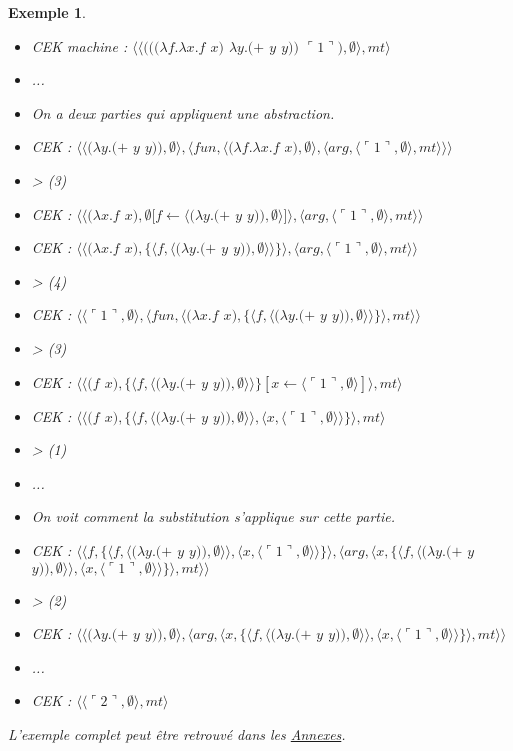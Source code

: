 \documentclass[10pt,a4paper]{report}
\newtheorem{ex}{Exemple}
\begin{document}
\begin{ex}
		\begin{itemize}
			\item[] CEK machine : $\langle\langle(((\lambda f.\lambda x.f$ $x)$ $\lambda y.(+$ $y$ $y))$ $\ulcorner 1\urcorner),\emptyset\rangle,mt\rangle$
			\item[] ...
			\item[] On a deux parties qui appliquent une abstraction.
			\item[] CEK : $\langle\langle(\lambda y.(+$ $y$ $y)),\emptyset\rangle,\langle fun,\langle(\lambda f.\lambda x.f$ $x),\emptyset\rangle,\langle arg,\langle\ulcorner 1\urcorner,\emptyset\rangle,mt\rangle\rangle\rangle$
			\item[] > (3) 
			\item[] CEK : $\langle\langle(\lambda x.f$ $x),\emptyset[f \leftarrow \langle(\lambda y.(+$ $y$ $y)),\emptyset\rangle]\rangle,\langle arg,\langle\ulcorner 1\urcorner,\emptyset\rangle,mt\rangle\rangle$
			\item[] CEK : $\langle\langle(\lambda x.f$ $x),\{\langle f,\langle(\lambda y.(+$ $y$ $y)),\emptyset\rangle\rangle\}\rangle,\langle arg,\langle\ulcorner 1\urcorner,\emptyset\rangle,mt\rangle\rangle$
			\item[] > (4) 
			\item[] CEK : $\langle\langle\ulcorner 1\urcorner,\emptyset\rangle,\langle fun,\langle(\lambda x.f$ $x),\{\langle f,\langle(\lambda y.(+$ $y$ $y)),\emptyset\rangle\rangle\}\rangle,mt\rangle\rangle$
			\item[] > (3) 
			\item[] CEK : $\langle\langle(f$ $x),\{\langle f,\langle(\lambda y.(+$ $y$ $y)),\emptyset\rangle\rangle\}[x \leftarrow \langle\ulcorner 1\urcorner,\emptyset\rangle]\rangle,mt\rangle$
			\item[] CEK : $\langle\langle(f$ $x),\{\langle f,\langle(\lambda y.(+$ $y$ $y)),\emptyset\rangle\rangle,\langle x,\langle\ulcorner 1\urcorner,\emptyset\rangle\rangle\}\rangle,mt\rangle$
			\item[] > (1)
			\item[] ...
			\item[] On voit comment la substitution s'applique sur cette partie.
			\item[] CEK : $\langle\langle f,\{\langle f,\langle(\lambda y.(+$ $y$ $y)),\emptyset\rangle\rangle,\langle x,\langle\ulcorner 1\urcorner,\emptyset\rangle\rangle\}\rangle,\langle arg,\langle x,\{\langle f,\langle(\lambda y.(+$ $y$ $y)),\emptyset\rangle\rangle,\langle x,\langle\ulcorner 1\urcorner,\emptyset\rangle\rangle\}\rangle,mt\rangle\rangle$
			\item[] > (2) 
			\item[] CEK : $\langle\langle(\lambda y.(+$ $y$ $y)),\emptyset\rangle,\langle arg,\langle x,\{\langle f,\langle(\lambda y.(+$ $y$ $y)),\emptyset\rangle\rangle,\langle x,\langle\ulcorner 1\urcorner,\emptyset\rangle\rangle\}\rangle,mt\rangle\rangle$
			\item[] ...
			\item[] CEK : $\langle\langle\ulcorner 2\urcorner,\emptyset\rangle,mt\rangle$
		\end{itemize}
		\medbreak
		
		L'exemple complet peut être retrouvé dans les \hyperref[CEK]{Annexes}.
	\end{ex}
\end{document}
